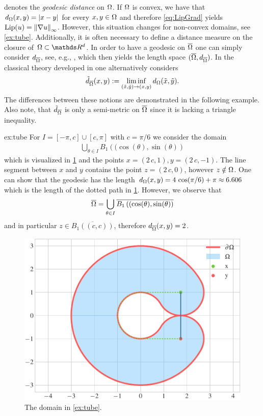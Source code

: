 %
denotes the \emph{geodesic distance} on $\Omega$. If $\Omega$ is convex, we have that $d_\Omega(x,y) = \left|x-y\right|$ for every 
$x,y\in \Omega$ and therefore \cref{eq:LipGrad} yields $\operatorname{Lip}(u) = \left\|\nabla u\right\|_\infty$. However, this situation changes for non-convex domains, see \cref{ex:tube}. Additionally, it is often necessary to define 
a distance measure on the closure of $\domain\subset\R^d$. In order to have a geodesic on $\overline{\Omega}$ one can simply consider $d_{\overline{\Omega}}$, see, e.g., \cite{bungert2021uniform}, which then yields the length space $(\overline{\Omega}, d_{\overline{\Omega}})$. In the classical theory developed in \cite{jensen1993uniqueness} one alternatively considers
%
\begin{align*}
\tilde{d}_{\overline{\Omega}}(x,y) := \liminf_{(\tilde x,\tilde y)\to(x,y)} d_\Omega(\tilde{x},\tilde{y}).
\end{align*}
%
The differences between these notions are demonstrated in the following example. Also note, that $\tilde{d}_{\overline{\Omega}}$ is only a semi-metric on $\overline{\Omega}$ since it is lacking a triangle inequality.
%
\begin{example}{}{ex:tube}
For $I = [-\pi, c]\cup [c, \pi]$ with $c=\pi/6$ we consider the domain
%
\begin{align*}
\bigcup_{\theta \in I} B_1\left((\cos(\theta),\sin(\theta)\right)
\end{align*}
%
which is visualized in \cref{fig:tube} and the points $x=(2\, c, 1), y= (2\, c, -1)$. The 
line segment between $x$ and $y$ contains the point $z=(2\, c, 0)$, however $z\notin \Omega$. One can show that 
the geodesic has the length $d_\Omega(x,y) = 4\, \cos(\pi/6) + \pi \approx 6.606$ which is the length of the dotted path 
in \cref{fig:tube}. However, we observe that 
%
\begin{align*}
\overline{\Omega} = \bigcup_{\theta \in I } 
\overline{B_1\left((\cos(\theta),\sin(\theta)\right)}
\end{align*}
%
and in particular $z\in \overline{B_1\left((c,c)\right)}$, therefore $d_{\overline{\Omega}}(x,y) = 2$.
\end{example}
%
\begin{figure}
\centering
\includegraphics[width=.5\textwidth]{code/domains/tube.pdf}
\caption{The domain in \cref{ex:tube}.}\label{fig:tube}
\end{figure}
%
%

